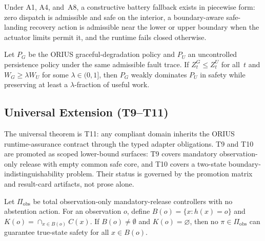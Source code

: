 \begin{proposition}\label{thm:T7}
Under A1, A4, and~A8, a constructive battery fallback exists in piecewise form:
zero dispatch is admissible and safe on the interior, a boundary-aware
safe-landing recovery action is admissible near the lower or upper boundary when
the actuator limits permit it, and the runtime fails closed otherwise.
\end{proposition}

\begin{theorem}\label{thm:T8}
Let $P_G$ be the ORIUS graceful-degradation policy and $P_U$ an uncontrolled
persistence policy under the same admissible fault trace.  If
$Z_t^G \le Z_t^U$ for all~$t$ and $W_G\ge\lambda W_U$ for some
$\lambda\in(0,1]$, then $P_G$ weakly dominates $P_U$ in safety while preserving
at least a $\lambda$-fraction of useful work.
\end{theorem}

\subsection{Universal Extension (T9--T11)}

The universal theorem is T11: any compliant domain inherits the ORIUS
runtime-assurance contract through the typed adapter obligations. T9 and T10
are promoted as scoped lower-bound surfaces: T9 covers mandatory
observation-only release with empty common safe core, and T10 covers a two-state
boundary-indistinguishability problem. Their status is governed by the
promotion matrix and result-card artifacts, not prose alone.

\begin{proposition}\label{thm:T9}
Let $\Pi_{\mathrm{obs}}$ be total observation-only mandatory-release
controllers with no abstention action.  For an observation $o$, define
$B(o)=\{x:h(x)=o\}$ and $K(o)=\cap_{x\in B(o)}C(x)$.  If
$B(o)\ne\emptyset$ and $K(o)=\varnothing$, then no
$\pi\in\Pi_{\mathrm{obs}}$ can guarantee true-state safety for all
$x\in B(o)$.
\end{proposition}

